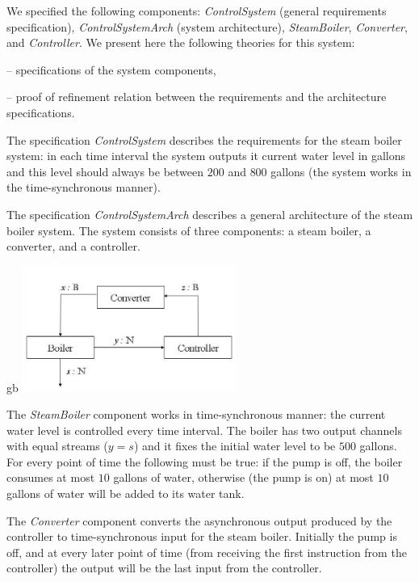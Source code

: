 We specified the following components: \emph{ControlSystem} (general requirements specification), 
\emph{ControlSystemArch} (system architecture),  
\emph{SteamBoiler}, \emph{Converter}, and \emph{Controller}. 
We present here the following \isah theories for this system:
\begin{itemize*} 
  \item {} --  specifications of the system components, 
  \item {} --  proof of refinement relation between the requirements and the architecture specifications.
\end{itemize*}
%
The specification \emph{ControlSystem} describes  
the requirements for the steam boiler system: 
in each time interval the system outputs it current water level in gallons
 and this level should always be between $200$ and $800$ gallons 
 (the system works in the  time-synchronous manner). 
 
The specification \emph{ControlSystemArch} describes a general  
architecture of the steam boiler system. 
The system consists of three components: a steam boiler,
a converter, and a controller. 

{\footnotesize
\begin{spec}{}{gb}
\centering
\includegraphics[width=7cm]{fig/BoilerSystemArch.jpg}
\end{spec}
}

The  \emph{SteamBoiler}  component works in time-synchronous manner: 
the current water level is controlled every time interval.
The boiler has two output channels with equal streams ($y = s$) and it
 fixes the initial water level to be $500$ gallons.
For every point of time the following must be true: if the pump is off, 
the boiler consumes at most $10$ gallons of water, 
otherwise (the pump is on) at most $10$ gallons of water will be added to its water tank.

The  \emph{Converter}   component converts the asynchronous output produced by the controller
to time-synchronous input for the steam boiler. 
Initially the pump is off, 
and at every later point of time (from receiving the first instruction 
from the controller) the output will be the last input from the controller. 

